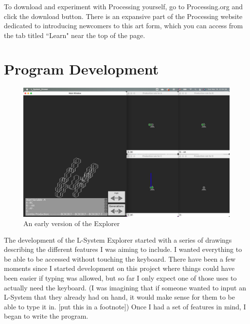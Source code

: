 \documentclass[12pt,twoside]{reedthesis}
\begin{document}
	To download and experiment with Processing yourself, go to Processing.org and click the download button. There is an expansive part of the Processing website dedicated to introducing newcomers to this art form, which you can access from the tab titled ``Learn" near the top of the page.


\section{Program Development}

		
	\begin{figure}[h]
	\centering
	\includegraphics[scale=0.3]{Images/EarlyExplorer}
	\caption{An early version of the Explorer}
	\label {EarlyExplorer}
	\end{figure}

	The development of the L-System Explorer started with a series of drawings describing the different features I was aiming to include. I wanted everything to be able to be accessed without touching the keyboard. There have been a few moments since I started development on this project where things could have been easier if typing was allowed, but so far I only expect one of those uses to actually need the keyboard. (I was imagining that if someone wanted to input an L-System that they already had on hand, it would make sense for them to be able to type it in. [put this in a footnote]) Once I had a set of features in mind, I began to write the program.
	
\end{document}
